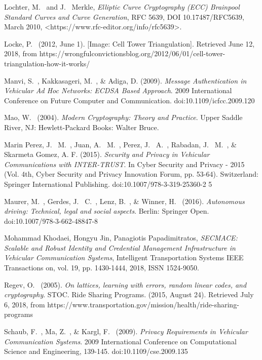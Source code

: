 \documentclass[conference,compsoc]{IEEEtran}
\begin{document}
\begin{thebibliography}{1}
Lochter, M.~ and J.~ Merkle, \emph{Elliptic Curve Cryptography (ECC) Brainpool Standard Curves and Curve Generation}, RFC 5639, DOI 10.17487/RFC5639, March 2010, <https://www.rfc-editor.org/info/rfc5639>.

Locke, P.~ (2012, June 1). [Image: Cell Tower Triangulation]. Retrieved June 12, 2018, from https://wrongfulconvictionsblog.org/2012/06/01/cell-tower-triangulation-how-it-works/

Manvi, S.~, Kakkasageri, M.~, \& Adiga, D. (2009). \emph{Message Authentication in Vehicular Ad Hoc Networks: ECDSA Based Approach}. 2009 International Conference on Future Computer and Communication. doi:10.1109/icfcc.2009.120

Mao, W.~ (2004). \emph{Modern Cryptography: Theory and Practice}. Upper Saddle River, NJ: Hewlett-Packard Books: Walter Bruce.

Marin Perez, J.~ M.~, Juan, A.~ M.~, Perez, J.~ A.~, Rabadan, J.~ M.~, \& Skarmeta Gomez, A. F. (2015). \emph{Security and Privacy in Vehicular Communications with INTER-TRUST}. In Cyber Security and Privacy - 2015 (Vol. 4th, Cyber Security and Privacy Innovation Forum, pp. 53-64). Switzerland: Springer International Publishing. doi:10.1007/978-3-319-25360-2 5

Maurer, M.~, Gerdes, J.~ C.~, Lenz, B.~, \& Winner, H.~ (2016). \emph{Autonomous driving: Technical, legal and social aspects}. Berlin: Springer Open. doi:10.1007/978-3-662-48847-8

Mohammad Khodaei, Hongyu Jin, Panagiotis Papadimitratos, \emph{SECMACE: Scalable and Robust Identity and Credential Management Infrastructure in Vehicular Communication Systems}, Intelligent Transportation Systems IEEE Transactions on, vol. 19, pp. 1430-1444, 2018, ISSN 1524-9050.

Regev, O.~ (2005). \emph{On lattices, learning with errors, random linear codes, and cryptography}. STOC.
Ride Sharing Programs. (2015, August 24). Retrieved July 6, 2018, from https://www.transportation.gov/mission/health/ride-sharing-programs

Schaub, F.~, Ma, Z.~, \& Kargl, F.~ (2009). \emph{Privacy Requirements in Vehicular Communication Systems}. 2009 International Conference on Computational Science and Engineering, 139-145. doi:10.1109/cse.2009.135


\end{thebibliography}
\end{document}
